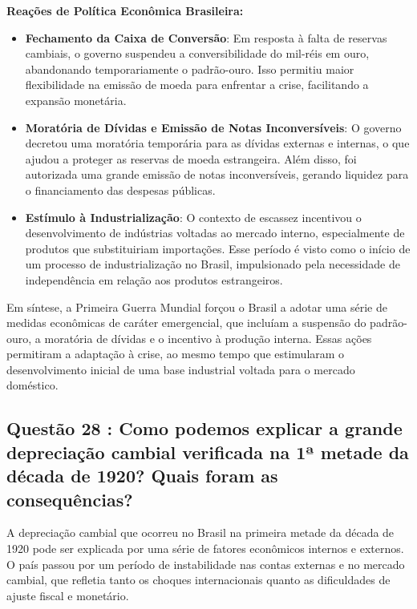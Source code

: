 \documentclass[a4paper,12pt]{article}[abntex2]
\begin{document}
\textbf{Reações de Política Econômica Brasileira:}
\begin{itemize}
    \item \textbf{Fechamento da Caixa de Conversão}: Em resposta à falta de reservas cambiais, o governo suspendeu a conversibilidade do mil-réis em ouro, abandonando temporariamente o padrão-ouro. Isso permitiu maior flexibilidade na emissão de moeda para enfrentar a crise, facilitando a expansão monetária.
    \item \textbf{Moratória de Dívidas e Emissão de Notas Inconversíveis}: O governo decretou uma moratória temporária para as dívidas externas e internas, o que ajudou a proteger as reservas de moeda estrangeira. Além disso, foi autorizada uma grande emissão de notas inconversíveis, gerando liquidez para o financiamento das despesas públicas.
    \item \textbf{Estímulo à Industrialização}: O contexto de escassez incentivou o desenvolvimento de indústrias voltadas ao mercado interno, especialmente de produtos que substituiriam importações. Esse período é visto como o início de um processo de industrialização no Brasil, impulsionado pela necessidade de independência em relação aos produtos estrangeiros.
\end{itemize}

Em síntese, a Primeira Guerra Mundial forçou o Brasil a adotar uma série de medidas econômicas de caráter emergencial, que incluíam a suspensão do padrão-ouro, a moratória de dívidas e o incentivo à produção interna. Essas ações permitiram a adaptação à crise, ao mesmo tempo que estimularam o desenvolvimento inicial de uma base industrial voltada para o mercado doméstico.

\subsection{\textbf{Questão 28 : Como podemos explicar a grande depreciação cambial verificada na 1ª metade da década de 1920? Quais foram as consequências?}}

A depreciação cambial que ocorreu no Brasil na primeira metade da década de 1920 pode ser explicada por uma série de fatores econômicos internos e externos. O país passou por um período de instabilidade nas contas externas e no mercado cambial, que refletia tanto os choques internacionais quanto as dificuldades de ajuste fiscal e monetário.
\end{document}
